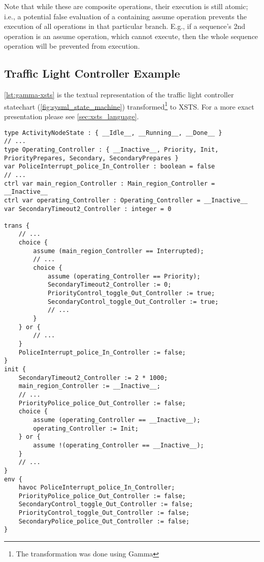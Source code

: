 Note that while these are composite operations, their execution is still atomic; i.e., a potential false evaluation of a containing assume operation prevents the execution of all operations in that particular branch. E.g., if a sequence's 2nd operation is an assume operation, which cannot execute, then the whole sequence operation will be prevented from execution.

\subsection{Traffic Light Controller Example}

\autoref{lst:gamma-xsts} is the textual representation of the traffic light controller statechart (\autoref{fig:sysml_state_machine}) transformed\footnote{The transformation was done using Gamma} to XSTS. For a more exact presentation please see \autoref{sec:xsts_language}.

\begin{lstlisting}[float,language=xsts, caption={Gamma XSTS Language representing the traffic light controller statechart.}, label={lst:gamma-xsts}]
type ActivityNodeState : { __Idle__, __Running__, __Done__ }
// ...
type Operating_Controller : { __Inactive__, Priority, Init, PriorityPrepares, Secondary, SecondaryPrepares }
var PoliceInterrupt_police_In_Controller : boolean = false
// ...
ctrl var main_region_Controller : Main_region_Controller = __Inactive__
ctrl var operating_Controller : Operating_Controller = __Inactive__
var SecondaryTimeout2_Controller : integer = 0

trans {
	// ...
	choice {
		assume (main_region_Controller == Interrupted); 
		// ...
		choice {
			assume (operating_Controller == Priority);
			SecondaryTimeout2_Controller := 0;
			PriorityControl_toggle_Out_Controller := true;
			SecondaryControl_toggle_Out_Controller := true;
			// ...
		}
	} or {
		// ...
	}
	PoliceInterrupt_police_In_Controller := false;
}
init {
	SecondaryTimeout2_Controller := 2 * 1000;
	main_region_Controller := __Inactive__;
	// ...
	PriorityPolice_police_Out_Controller := false;
	choice {
		assume (operating_Controller == __Inactive__);
		operating_Controller := Init;
	} or {
		assume !(operating_Controller == __Inactive__);
	}
	// ...
}
env {
	havoc PoliceInterrupt_police_In_Controller;
	PriorityPolice_police_Out_Controller := false;
	SecondaryControl_toggle_Out_Controller := false;
	PriorityControl_toggle_Out_Controller := false;
	SecondaryPolice_police_Out_Controller := false;
}
\end{lstlisting}
